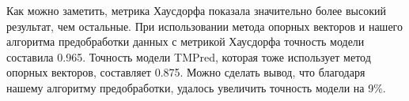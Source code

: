 \begin{table}[htb]
  \caption{Точность моделей бинарной классификации, обученных на данных, полученных разными метриками}
  \label{table-accuracy}
\end{table}

Как можно заметить, метрика Хаусдорфа показала значительно более высокий результат, чем остальные. При использовании метода опорных векторов и нашего алгоритма предобработки данных с метрикой Хаусдорфа точность модели составила 0.965. Точность модели TMPred, которая тоже использует метод опорных векторов, составляет 0.875. Можно сделать вывод, что благодаря нашему алгоритму предобработки, удалось увеличить точность модели на 9\%.
